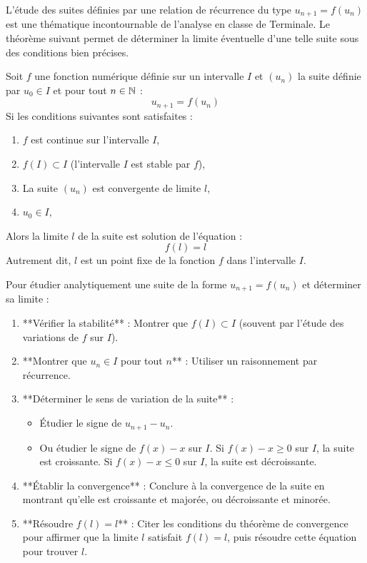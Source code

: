 L'étude des suites définies par une relation de récurrence du type $u_{n+1} = f(u_n)$ est une thématique incontournable de l'analyse en classe de Terminale. Le théorème suivant permet de déterminer la limite éventuelle d'une telle suite sous des conditions bien précises.

\begin{theoreme}[Limite d'une suite récurrente $u_{n+1} = f(u_n)$]
Soit $f$ une fonction numérique définie sur un intervalle $I$ et $(u_n)$ la suite définie par $u_0 \in I$ et pour tout $n \in \mathbb{N}$ :
\[
u_{n+1} = f(u_n)
\]
Si les conditions suivantes sont satisfaites :
\begin{enumerate}
    \item $f$ est continue sur l'intervalle $I$,
    \item $f(I) \subset I$ (l'intervalle $I$ est stable par $f$),
    \item La suite $(u_n)$ est convergente de limite $l$,
    \item $u_0 \in I$,
\end{enumerate}
Alors la limite $l$ de la suite est solution de l'équation :
\[
f(l) = l
\]
Autrement dit, $l$ est un point fixe de la fonction $f$ dans l'intervalle $I$.
\end{theoreme}

\begin{methode}[Étudier la convergence et la limite de $u_{n+1} = f(u_n)$]
Pour étudier analytiquement une suite de la forme $u_{n+1} = f(u_n)$ et déterminer sa limite :
\begin{enumerate}
    \item **Vérifier la stabilité** : Montrer que $f(I) \subset I$ (souvent par l'étude des variations de $f$ sur $I$).
    \item **Montrer que $u_n \in I$ pour tout $n$** : Utiliser un raisonnement par récurrence.
    \item **Déterminer le sens de variation de la suite** :
    \begin{itemize}
        \item Étudier le signe de $u_{n+1} - u_n$.
        \item Ou étudier le signe de $f(x) - x$ sur $I$. Si $f(x) - x \ge 0$ sur $I$, la suite est croissante. Si $f(x) - x \le 0$ sur $I$, la suite est décroissante.
    \end{itemize}
    \item **Établir la convergence** : Conclure à la convergence de la suite en montrant qu'elle est croissante et majorée, ou décroissante et minorée.
    \item **Résoudre $f(l) = l$** : Citer les conditions du théorème de convergence pour affirmer que la limite $l$ satisfait $f(l) = l$, puis résoudre cette équation pour trouver $l$.
\end{enumerate}
\end{methode}

